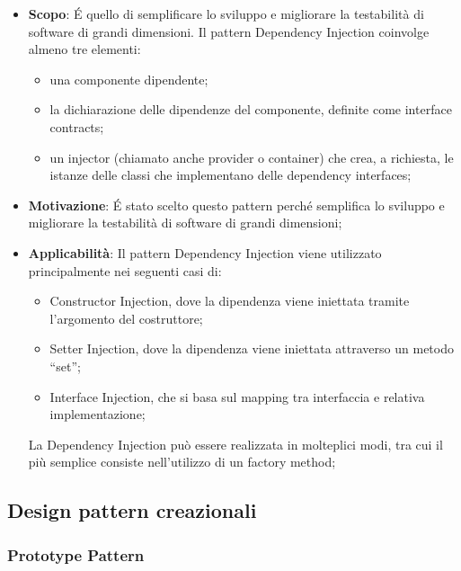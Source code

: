 		\begin{itemize}
			\item \textbf{Scopo}: \'E quello di semplificare lo sviluppo e migliorare la testabilità di software di grandi dimensioni.
Il pattern Dependency Injection coinvolge almeno tre elementi:

				\begin{itemize}
					\item una componente dipendente;
					\item la dichiarazione delle dipendenze del componente, definite come interface contracts;
					\item un injector (chiamato anche provider o container) che crea, a richiesta, le istanze delle classi che implementano delle dependency interfaces;
				\end{itemize}

			\item \textbf{Motivazione}: \'E stato scelto questo pattern perché semplifica lo sviluppo e migliorare la testabilità di software di grandi dimensioni;

			\item \textbf{Applicabilità}: Il pattern Dependency Injection viene utilizzato principalmente nei seguenti casi di:
			\begin{itemize}
			\item Constructor Injection, dove la dipendenza viene iniettata tramite l’argomento del costruttore;
			\item Setter Injection, dove la dipendenza viene iniettata attraverso un metodo “set”;
			\item Interface Injection, che si basa sul mapping tra interfaccia e relativa implementazione;
			\end{itemize}
La Dependency Injection può essere realizzata in molteplici modi, tra cui il più semplice consiste nell'utilizzo di un factory method;

		\end{itemize}



	\clearpage
	\newpage
	\subsection{Design pattern creazionali} %
		\subsubsection{Prototype Pattern} %


